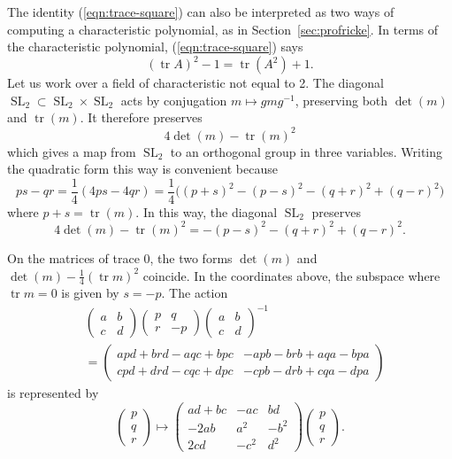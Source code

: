 \documentclass[11pt]{amsart}
\theoremstyle{definition}
\numberwithin{figure}{section}
\numberwithin{equation}{section}
\numberwithin{table}{section}
\newcommand{\SL}{\operatorname{SL}}
\newcommand{\tr}{\operatorname{tr}}
\begin{document}
The identity (\ref{eqn:trace-square}) can also be interpreted as two ways of computing a characteristic polynomial, as in Section~\ref{sec:profricke}.
In terms of the characteristic polynomial, (\ref{eqn:trace-square}) says
\begin{equation} \label{eqn:trace-square1}
(\tr{A})^2-1 = \tr(A^2)+1.
\end{equation}
Let us work over a field of characteristic not equal to 2.
The diagonal $\SL_2 \subset \SL_2 \times \SL_2$ acts by conjugation $m \mapsto gmg^{-1}$, preserving both $\det(m)$ and $\tr(m)$.
It therefore preserves
\[
4\det(m) - \tr(m)^2
\]
which gives a map from $\SL_2$ to an orthogonal group in three variables.
Writing the quadratic form this way is convenient because
\begin{equation} \label{eqn:det-22}
ps-qr = \frac{1}{4}(4ps - 4qr) = \frac{1}{4}\big( (p+s)^2-(p-s)^2-(q+r)^2+(q-r)^2 \big) 
\end{equation}
where $p+s=\tr(m)$.
In this way, the diagonal $\SL_2$ preserves
\[
4\det(m)-\tr(m)^2 = -(p-s)^2-(q+r)^2+(q-r)^2.
\]

On the matrices of trace 0, the two forms $\det(m)$ and $\det(m)-\frac{1}{4}(\tr{m})^2$ coincide.
In the coordinates above, the subspace where $\tr{m}=0$ is given by $s=-p$.
The action
\begin{align*}
&\begin{pmatrix} a & b \\ c & d \end{pmatrix}\begin{pmatrix} p & q \\ r & -p \end{pmatrix}\begin{pmatrix} a & b \\ c & d \end{pmatrix}^{-1}
 \\
&=\begin{pmatrix} apd+brd-aqc+bpc & -apb-brb+aqa-bpa \\ cpd+drd-cqc+dpc & -cpb-drb+cqa-dpa \end{pmatrix}
\end{align*}
is represented by
\[
\begin{pmatrix} p \\ q \\ r \end{pmatrix} \mapsto \begin{pmatrix} ad+bc & -ac & bd \\ -2ab & a^2 & -b^2 \\ 2cd & -c^2 & d^2 \end{pmatrix} \begin{pmatrix} p \\ q \\ r \end{pmatrix}
.
\]
\end{document}
